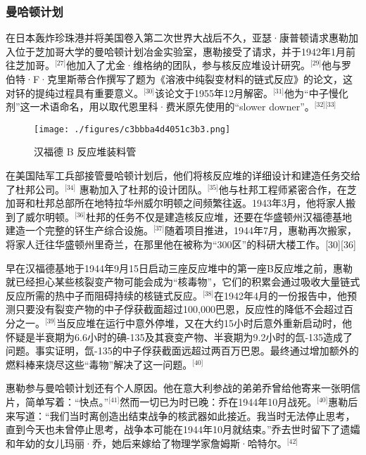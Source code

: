 \subsubsection{曼哈顿计划}
在日本轰炸珍珠港并将美国卷入第二次世界大战后不久，亚瑟·康普顿请求惠勒加入位于芝加哥大学的曼哈顿计划冶金实验室，惠勒接受了请求，并于1942年1月前往芝加哥。\(^\text{[27]}\)他加入了尤金·维格纳的团队，参与核反应堆设计研究。\(^\text{[29]}\)他与罗伯特·F·克里斯蒂合作撰写了题为《溶液中纯裂变材料的链式反应》的论文，这对钚的提纯过程具有重要意义。\(^\text{[30]}\)该论文于1955年12月解密。\(^\text{[31]}\)他为“中子慢化剂”这一术语命名，用以取代恩里科·费米原先使用的“slower downer”。\(^\text{[32][33]}\)
\begin{figure}[ht]
\centering
\texttt{[image: ./figures/c3bbba4d4051c3b3.png]}
\caption{汉福德 B 反应堆装料管} \label{fig_YHhl_1}
\end{figure}
在美国陆军工兵部接管曼哈顿计划后，他们将核反应堆的详细设计和建造任务交给了杜邦公司。\(^\text{[34]}\) 惠勒加入了杜邦的设计团队。\(^\text{[35]}\)他与杜邦工程师紧密合作，在芝加哥和杜邦总部所在地特拉华州威尔明顿之间频繁往返。1943年3月，他将家人搬到了威尔明顿。\(^\text{[36]}\)杜邦的任务不仅是建造核反应堆，还要在华盛顿州汉福德基地建造一个完整的钚生产综合设施。\(^\text{[37]}\)随着项目推进，1944年7月，惠勒再次搬家，将家人迁往华盛顿州里奇兰，在那里他在被称为“300区”的科研大楼工作。[30][36]

早在汉福德基地于1944年9月15日启动三座反应堆中的第一座B反应堆之前，惠勒就已经担心某些核裂变产物可能会成为“核毒物”，它们的积累会通过吸收大量链式反应所需的热中子而阻碍持续的核链式反应。\(^\text{[38]}\)在1942年4月的一份报告中，他预测只要没有裂变产物的中子俘获截面超过100,000巴恩，反应性的降低不会超过百分之一。\(^\text{[39]}\)当反应堆在运行中意外停堆，又在大约15小时后意外重新启动时，他怀疑是半衰期为6.6小时的碘-135及其衰变产物、半衰期为9.2小时的氙-135造成了问题。事实证明，氙-135的中子俘获截面远超过两百万巴恩。最终通过增加额外的燃料棒来烧尽这些“毒物”解决了这一问题。\(^\text{[40]}\)

惠勒参与曼哈顿计划还有个人原因。他在意大利参战的弟弟乔曾给他寄来一张明信片，简单写着：“快点。”\(^\text{[41]}\)然而一切已为时已晚：乔在1944年10月战死。\(^\text{[40]}\)惠勒后来写道：“我们当时离创造出结束战争的核武器如此接近。我当时无法停止思考，直到今天也未曾停止思考，战争本可能在1944年10月就结束。”乔去世时留下了遗孀和年幼的女儿玛丽·乔，她后来嫁给了物理学家詹姆斯·哈特尔。\(^\text{[42]}\)
